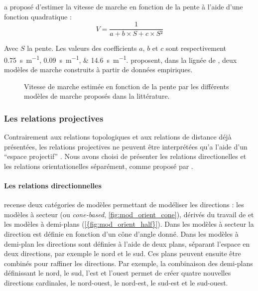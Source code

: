 \textcite{Rees2004} a proposé d'estimer la vitesse de marche en
fonction de la pente à l'aide d'une fonction quadratique :
\begin{equation}
  V = \dfrac{1}{a + b × S + c × S²}
\end{equation}

Avec \(S\) la pente. Les valeurs des coefficients \(a\), \(b\) et
\(c\) sont respectivement \SIlist{0,75;0,09;14,6}{\second\per\meter}.
\textcite{Irmischer2017,Kerouanton2020} proposent, dans la lignée de
\textcite{Tobler1993}, deux modèles de marche construits à partir de
données empiriques.



\begin{figure}
  \centering
  
  \caption{Vitesse de marche estimée en fonction de la pente par les
    différents modèles de marche proposés dans la littérature.}
  \label{fig:modeles_marche}
\end{figure}


\subsubsection{Les relations projectives}

Contrairement aux relations topologiques et aux relations de distance
déjà présentées, les relations projectives ne peuvent être
interprétées qu'a l'aide d'un \enquote{espace projectif}
\autocite{Duchene2019}. Nous avons choisi de présenter les relations
directionelles et les relations orientationelles séparément, comme
proposé par \textcite{Duchene2019}.


\paragraph{Les relations directionnelles}

\textcite{Frank1992} recense deux catégories de modèles permettant de
modéliser les directions : les modèles à secteur (ou
\emph{cone-based}, \autoref{fig:mod_orient_cone}), dérivés du travail
de \textcite{Peuquet1987} et les modèles à demi-plans
(\autoref{{fig:mod_orient_half}}). Dans les modèles à secteur la
direction est définie en fonction d'un cône d'angle donné. Dans les
modèles à demi-plan les directions sont définies à l'aide de deux
plans, séparant l'espace en deux directions, par exemple le nord et le
sud. Ces plans peuvent ensuite être combinés pour raffiner les
directions. Par exemple, la combinaison des demi-plans définissant le
nord, le sud, l'est et l'ouest permet de créer quatre nouvelles
directions cardinales, le nord-ouest, le nord-est, le sud-est et le
sud-ouest.

